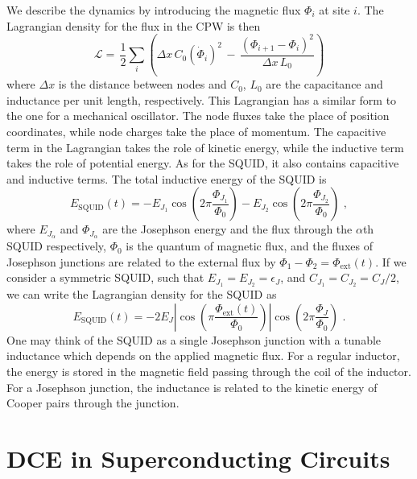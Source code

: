 We describe the dynamics by introducing the magnetic flux $\Phi_i$ at site $i$. The Lagrangian density for the flux in the CPW is then
%
\begin{equation}\label{eq:CPW_lagrangian}
\mathcal{L} = \, \frac{1}{2} \sum_i \left( \Delta x \, C_{0} \left(\dot{\Phi}_{i}\right)^{2} \, - \, 
\frac{\left(\Phi_{i+1}-\Phi_{i}\right)^{2}}{\Delta x \, L_{0}} \right)
\end{equation}
%
where $\Delta x$ is the distance between nodes and $C_0$, $L_0$ are the capacitance and inductance per unit length, respectively. This Lagrangian has a similar form to the one for a mechanical oscillator. The node fluxes take the place of position coordinates, while node charges take the place of momentum. The capacitive term in the Lagrangian takes the role of kinetic energy, while the inductive term takes the role of potential energy.
As for the SQUID, it also contains capacitive and inductive terms. The total inductive energy of the SQUID is
%
\begin{equation}\label{eq:squid_energy_assym}
    E_{\text{SQUID}}(t) = - E_{J_1} \cos{\left(2\pi
    \frac{\Phi_{J_1}}{\Phi_0}\right)} - E_{J_2} \cos{\left(2\pi
    \frac{\Phi_{J_2}}{\Phi_0}\right)} \, \, ,
\end{equation}
%
where $E_{J_\alpha}$ and $\Phi_{J_\alpha}$ are the Josephson energy and the flux through the $\alpha$th SQUID respectively, $\Phi_0$ is the quantum of magnetic flux, and the fluxes of Josephson junctions are related to the external flux by $\Phi_1 - \Phi_2  = \Phi_{\text{ext}}(t)$. If we consider a symmetric SQUID, such that $E_{J_1} = E_{J_2} = \epsilon_J$, and
$C_{J_1} = C_{J_2} = C_J/2$, we can write the Lagrangian density for the SQUID as
%
\begin{equation}\label{eq:squid_energy_symm}
    E_{\text{SQUID}}(t) = -2E_J \left|\cos\left(\pi\frac{\Phi_{\text{ext}}(t)}{\Phi_0}\right)\right|
    \cos\left(2\pi \frac{\Phi_J}{\Phi_0} \right) \, \, .
\end{equation}
%
One may think of the SQUID as a single Josephson junction with a tunable inductance which depends on the applied magnetic flux. For a regular inductor, the energy is stored in the magnetic field passing through the coil of the inductor. For a Josephson junction, the inductance is related to the kinetic energy of Cooper pairs through the junction.


\section{DCE in Superconducting Circuits}\label{sec:DCE_in_SC}

